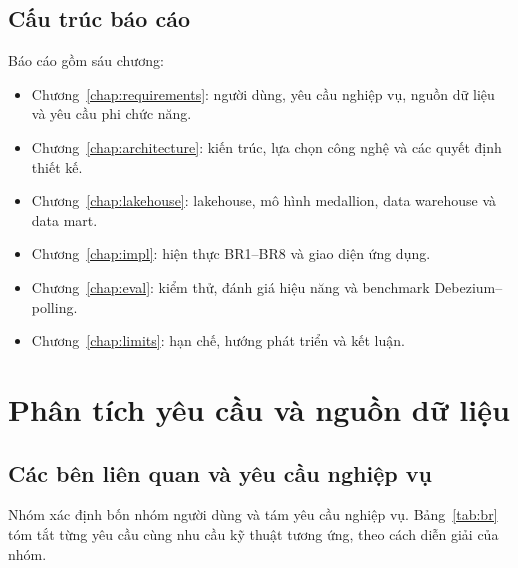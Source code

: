 \subsection{Cấu trúc báo cáo}

Báo cáo gồm sáu chương:
\begin{itemize}
  \item Chương~\ref{chap:requirements}: người dùng, yêu cầu nghiệp vụ, nguồn dữ liệu và yêu cầu phi chức năng.
  \item Chương~\ref{chap:architecture}: kiến trúc, lựa chọn công nghệ và các quyết định thiết kế.
  \item Chương~\ref{chap:lakehouse}: lakehouse, mô hình medallion, data warehouse và data mart.
  \item Chương~\ref{chap:impl}: hiện thực BR1--BR8 và giao diện ứng dụng.
  \item Chương~\ref{chap:eval}: kiểm thử, đánh giá hiệu năng và benchmark Debezium--polling.
  \item Chương~\ref{chap:limits}: hạn chế, hướng phát triển và kết luận.
\end{itemize}

\section{Phân tích yêu cầu và nguồn dữ liệu}

\subsection{Các bên liên quan và yêu cầu nghiệp vụ}

Nhóm xác định bốn nhóm người dùng và tám yêu cầu nghiệp vụ. Bảng~\ref{tab:br} tóm tắt từng yêu cầu cùng nhu cầu kỹ thuật tương ứng, theo cách diễn giải của nhóm.

